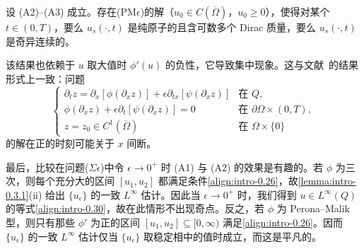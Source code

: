 \documentclass[../main.tex]{subfiles}
\begin{document}
\begin{proposition}\label{proposition:intro-0.3.3}
设 (A2)--(A3) 成立。存在(PM$\epsilon$)的解（$u_0\in C(\overline\Omega)$，$u_0\geqslant0$），使得对某个 $t\in(0,T)$，要么 $u_s(\cdot,t)$ 是纯原子的且含可数多个 Dirac 质量，要么 $u_s(\cdot,t)$ 是奇异连续的。
\end{proposition}

该结果也依赖于 $u$ 取大值时 $\phi'(u)$ 的负性，它导致集中现象。这与文献~\cite{ref11}的结果形式上一致：问题
\[
\begin{cases}
\partial_t z = \partial_x[\phi(\partial_x z)] + \epsilon\partial_{tx}[\psi(\partial_x z)] & \text{在 }Q,\\
\phi(\partial_x z) + \epsilon\partial_t[\psi(\partial_x z)] = 0 & \text{在 }\partial\Omega\times(0,T),\\
z=z_0\in C^1(\overline\Omega) & \text{在 }\Omega\times\{0\}
\end{cases}
\]
的解在正的时刻可能关于 $x$ 间断。

最后，比较在问题($\Sigma\epsilon$)中令 $\epsilon\to0^+$ 时 (A1) 与 (A2) 的效果是有趣的。若 $\phi$ 为三次，则每个充分大的区间 $[u_1,u_2]$ 都满足条件\eqref{align:intro-0.26}，故\cref{lemma:intro-0.3.1}(ii) 给出 $\{u_\epsilon\}$ 的一致 $L^\infty$ 估计。因此当 $\epsilon\to0^+$ 时，我们得到 $u\in L^\infty(Q)$ 的等式\eqref{align:intro-0.30}，故在此情形不出现奇点。反之，若 $\phi$ 为 Perona--Malik 型，则只有那些 $\phi'$ 为正的区间 $[u_1,u_2]\subseteq[0,\infty)$ 满足\eqref{align:intro-0.26}。因而 $\{u_\epsilon\}$ 的一致 $L^\infty$ 估计仅当 $\{u_\epsilon\}$ 取稳定相中的值时成立，而这是平凡的。
\end{document}
